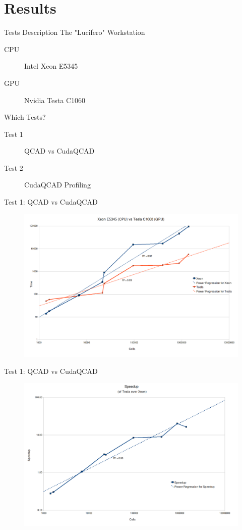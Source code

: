 \documentclass[10pt, red]{beamer}
\begin{document}
\section{Results}

	\begin{frame}{Tests Description}
		The "Lucifero" Workstation
		\begin{description}
			\item[CPU] Intel Xeon E5345
			\item[GPU] Nvidia Testa C1060
		\end{description}
		Which Tests?
		\begin{description}
			\item[Test 1] QCAD vs CudaQCAD
			\item[Test 2] CudaQCAD Profiling
		\end{description}
	\end{frame}

	\begin{frame}{Test 1: QCAD vs CudaQCAD}
	 	\begin{figure}
			\centering
			\includegraphics[width=\textwidth]{img/xeonvstesla}
	 	\end{figure} 
	\end{frame}

	\begin{frame}{Test 1: QCAD vs CudaQCAD}
	 	\begin{figure}
			\centering
			\includegraphics[width=\textwidth]{img/speedup}
	 	\end{figure} 
	\end{frame}
\end{document}
